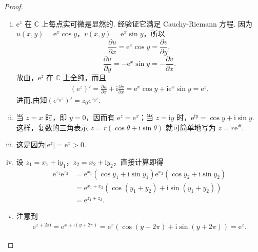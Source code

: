 \documentclass[../../main.tex]{subfiles}%
\begin{document}
\begin{proof}
\begin{enumerate}[(i)]
\item \( \mathrm{e}^z \) 在 \( \mathbb{C} \) 上每点实可微是显然的. 经验证它满足 Cauchy-Riemann 方程. 因为 \( u(x, y) = \mathrm{e}^x \cos y \)，\( v(x, y) = \mathrm{e}^x \sin y \)，所以
\[
\frac{\partial u}{\partial x} = \mathrm{e}^x \cos y = \frac{\partial v}{\partial y},
\]
\[
\frac{\partial u}{\partial y} = -\mathrm{e}^x \sin y = -\frac{\partial v}{\partial x}.
\]
故由，\( \mathrm{e}^z \) 在 \( \mathbb{C} \) 上全纯，而且
\begin{align*}
(\mathrm{e}^z)' = \frac{\partial u}{\partial x} + \mathrm{i} \frac{\partial v}{\partial x}= \mathrm{e}^x \cos y + \mathrm{i} \mathrm{e}^x \sin y= \mathrm{e}^z.
\end{align*}
进而,由知$\left( e^{z_0z} \right) ' =z_0e^{z_0z}.$

\item 当 \( z = x \) 时，即 \( y = 0 \)，因而有 \( \mathrm{e}^z = \mathrm{e}^x \)；当 \( z = \mathrm{i}y \) 时，\( \mathrm{e}^{\mathrm{i}y} = \cos y + \mathrm{i}\sin y \). 这样，复数的三角表示 \( z = r(\cos\theta + \mathrm{i}\sin\theta) \) 就可简单地写为 \( z = r\mathrm{e}^{\mathrm{i}\theta} \).

\item 这是因为$|\mathrm{e}^z| = \mathrm{e}^x > 0.$

\item 设 \( z_1 = x_1 + \mathrm{i}y_1 \)，\( z_2 = x_2 + \mathrm{i}y_2 \)，直接计算即得
\begin{align*}
\mathrm{e}^{z_1} \mathrm{e}^{z_2} &= \mathrm{e}^{x_1} (\cos y_1 + \mathrm{i}\sin y_1) \mathrm{e}^{x_2} (\cos y_2 + \mathrm{i}\sin y_2)\\
&= \mathrm{e}^{x_1 + x_2} (\cos(y_1 + y_2) + \mathrm{i}\sin(y_1 + y_2))\\
&= \mathrm{e}^{z_1 + z_2}.
\end{align*}

\item 注意到
\begin{align*}
\mathrm{e}^{z + 2\pi\mathrm{i}} = \mathrm{e}^{x + \mathrm{i}(y + 2\pi)}= \mathrm{e}^x (\cos(y + 2\pi) + \mathrm{i}\sin(y + 2\pi))= \mathrm{e}^z.
\end{align*}
\end{enumerate}

\end{proof}
\end{document}
